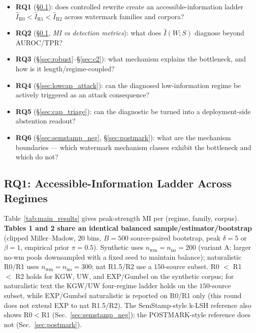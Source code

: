 \documentclass[11pt]{article}
\begin{document}
\begin{itemize}\itemsep0pt
\item \textbf{RQ1} (\S\ref{sec:c1}): does controlled rewrite create an
accessible-information ladder $\hat I_{\mathrm{R0}} < \hat I_{\mathrm{R1}}
< \hat I_{\mathrm{R2}}$ across watermark families and corpora?
\item \textbf{RQ2} (\S\ref{sec:c1}, \emph{MI vs detection metrics}): what
does $\hat I(W;S)$ diagnose beyond AUROC/TPR?
\item \textbf{RQ3} (\S\ref{sec:robust}--\S\ref{sec:c2}): what mechanism
explains the bottleneck, and how is it length/regime-coupled?
\item \textbf{RQ4} (\S\ref{sec:lowcap_attack}): can the diagnosed
low-information regime be actively triggered as an attack consequence?
\item \textbf{RQ5} (\S\ref{sec:cap_triage}): can the diagnostic be
turned into a deployment-side abstention readout?
\item \textbf{RQ6} (\S\ref{sec:semstamp_neg}, \S\ref{sec:postmark}): what
are the mechanism boundaries --- which watermark mechanism classes
exhibit the bottleneck and which do not?
\end{itemize}

\subsection{RQ1: Accessible-Information Ladder Across Regimes}
\label{sec:c1}



Table~\ref{tab:main_results} gives peak-strength MI per (regime, family,
corpus). \textbf{Tables 1 and 2 share an identical balanced
sample/estimator/bootstrap} (clipped Miller--Madow, $20$ bins, $B{=}500$
source-paired bootstrap, peak $\delta{=}5$ or $\beta{=}1$, empirical prior
$\pi{=}0.5$). Synthetic uses $n_{\text{wm}}{=}n_{\text{no}}{=}200$
(variant A; larger no-wm pools downsampled with a fixed seed to maintain
balance); naturalistic R0/R1 uses $n_{\text{wm}}{=}n_{\text{no}}{=}300$;
nat R1.5/R2 use a $150$-source subset. R0 $<$ R1 $<$ R2 holds for KGW,
UW, and EXP/Gumbel on the synthetic corpus; for naturalistic text the
KGW/UW four-regime ladder holds on the $150$-source subset, while
EXP/Gumbel naturalistic is reported on R0/R1 only (this round does not
extend EXP to nat R1.5/R2). The SemStamp-style k-LSH reference also shows
R0$<$R1 (Sec.~\ref{sec:semstamp_neg}); the POSTMARK-style reference does
not (Sec.~\ref{sec:postmark}).
\end{document}
